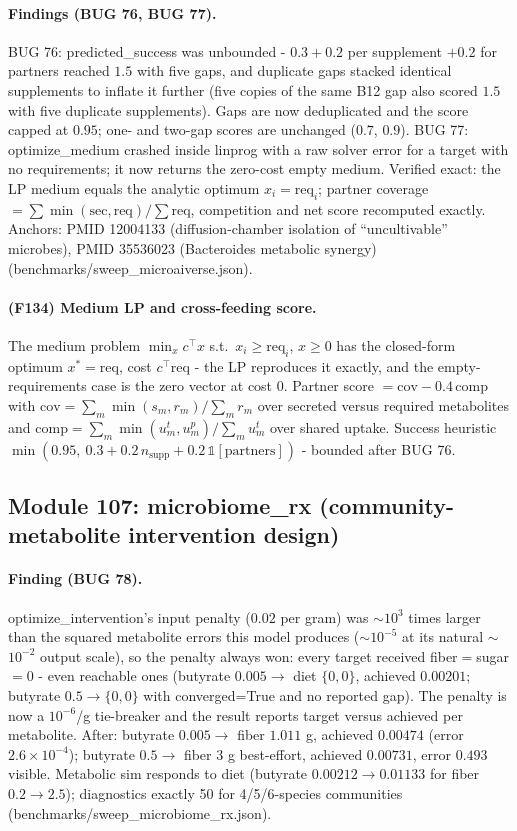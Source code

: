 \paragraph{Findings (BUG 76, BUG 77).} BUG 76: predicted\_success was unbounded - $0.3+0.2$ per supplement $+0.2$ for partners reached $1.5$ with five gaps, and duplicate gaps stacked identical supplements to inflate it further (five copies of the same B12 gap also scored $1.5$ with five duplicate supplements). Gaps are now deduplicated and the score capped at $0.95$; one- and two-gap scores are unchanged ($0.7$, $0.9$). BUG 77: optimize\_medium crashed inside linprog with a raw solver error for a target with no requirements; it now returns the zero-cost empty medium. Verified exact: the LP medium equals the analytic optimum $x_i=\mathrm{req}_i$; partner coverage $=\sum\min(\mathrm{sec},\mathrm{req})/\sum\mathrm{req}$, competition and net score recomputed exactly. Anchors: PMID 12004133 (diffusion-chamber isolation of ``uncultivable'' microbes), PMID 35536023 (Bacteroides metabolic synergy) (benchmarks/sweep\_microaiverse.json).
\paragraph{(F134) Medium LP and cross-feeding score.} The medium problem $\min_x c^\top x$ s.t.\ $x_i\ge\mathrm{req}_i$, $x\ge0$ has the closed-form optimum $x^\ast=\mathrm{req}$, cost $c^\top\mathrm{req}$ - the LP reproduces it exactly, and the empty-requirements case is the zero vector at cost $0$. Partner score $=\mathrm{cov}-0.4\,\mathrm{comp}$ with $\mathrm{cov}=\sum_m\min(s_m,r_m)/\sum_m r_m$ over secreted versus required metabolites and $\mathrm{comp}=\sum_m\min(u^t_m,u^p_m)/\sum_m u^t_m$ over shared uptake. Success heuristic $\min(0.95,\ 0.3+0.2\,n_{\mathrm{supp}}+0.2\,\mathbb{1}[\mathrm{partners}])$ - bounded after BUG 76.
\subsection{Module 107: microbiome\_rx (community-metabolite intervention design)}
\paragraph{Finding (BUG 78).} optimize\_intervention's input penalty ($0.02$ per gram) was $\sim$$10^3$ times larger than the squared metabolite errors this model produces ($\sim$$10^{-5}$ at its natural $\sim$$10^{-2}$ output scale), so the penalty always won: every target received fiber$=$sugar$=0$ - even reachable ones (butyrate $0.005\to$ diet $\{0,0\}$, achieved $0.00201$; butyrate $0.5\to\{0,0\}$ with converged=True and no reported gap). The penalty is now a $10^{-6}$/g tie-breaker and the result reports target versus achieved per metabolite. After: butyrate $0.005\to$ fiber $1.011$ g, achieved $0.00474$ (error $2.6\times10^{-4}$); butyrate $0.5\to$ fiber $3$ g best-effort, achieved $0.00731$, error $0.493$ visible. Metabolic sim responds to diet (butyrate $0.00212\to0.01133$ for fiber $0.2\to2.5$); diagnostics exactly 50 for 4/5/6-species communities (benchmarks/sweep\_microbiome\_rx.json).
